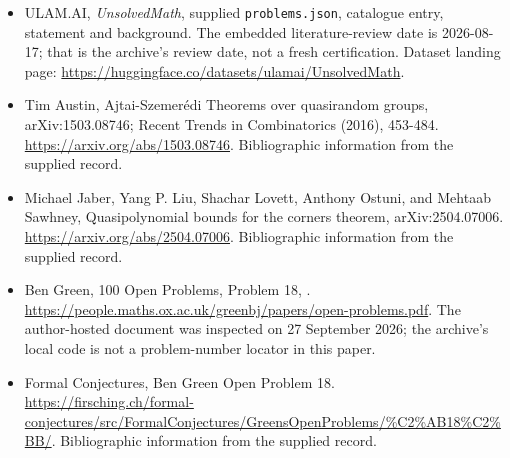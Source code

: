 \documentclass[11pt,a4paper]{article}
\begin{document}
{\small

\begin{itemize}

\item[\hypertarget{source:statement:1}{S1}] ULAM.AI, \emph{UnsolvedMath}, supplied \texttt{problems.json}, catalogue entry, statement and background. The embedded literature-review date is 2026-08-17; that is the archive’s review date, not a fresh certification. Dataset landing page: \url{https://huggingface.co/datasets/ulamai/UnsolvedMath}.

\item[\hypertarget{source:statement:2}{S2}] Tim Austin, Ajtai-Szemerédi Theorems over quasirandom groups, arXiv:1503.08746; Recent Trends in Combinatorics (2016), 453-484. \url{https://arxiv.org/abs/1503.08746}. Bibliographic information from the supplied record.

\item[\hypertarget{source:statement:3}{S3}] Michael Jaber, Yang P. Liu, Shachar Lovett, Anthony Ostuni, and Mehtaab Sawhney, Quasipolynomial bounds for the corners theorem, arXiv:2504.07006. \url{https://arxiv.org/abs/2504.07006}. Bibliographic information from the supplied record.

\item[\hypertarget{source:statement:4}{S4}] Ben Green, 100 Open Problems, Problem 18, . \url{https://people.maths.ox.ac.uk/greenbj/papers/open-problems.pdf}. The author-hosted document was inspected on 27 September 2026; the archive’s local code is not a problem-number locator in this paper.

\item[\hypertarget{source:statement:5}{S5}] Formal Conjectures, Ben Green Open Problem 18. \url{https://firsching.ch/formal-conjectures/src/FormalConjectures/GreensOpenProblems/%C2%AB18%C2%BB/}. Bibliographic information from the supplied record.

\end{itemize}

}

\label{end:statement}
\end{document}
